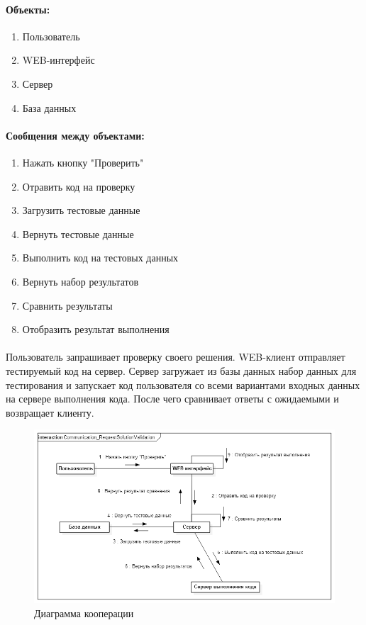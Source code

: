\documentclass{article}
\begin{document}
        \paragraph{Объекты:}
        \begin{enumerate}
            \item Пользователь
            \item WEB-интерфейс
            \item Сервер
            \item База данных
        \end{enumerate}
        \paragraph{Сообщения между объектами:}
        \begin{enumerate}
            \item Нажать кнопку "Проверить"
            \item Отравить код на проверку
            \item Загрузить тестовые данные
            \item Вернуть тестовые данные
            \item Выполнить код на тестовых данных
            \item Вернуть набор результатов
            \item Сравнить результаты
            \item Отобразить результат выполнения
        \end{enumerate}
        \paragraph{}
        Пользователь запрашивает проверку своего решения. WEB-клиент отправляет
        тестируемый код на сервер. Сервер загружает из базы данных набор
        данных для тестирования и запускает код пользователя со всеми вариантами
        входных данных на сервере выполнения кода. После чего сравнивает ответы
        с ожидаемыми и возвращает клиенту.
        \begin{figure}[H]
            \includegraphics[width=\textwidth, center]
                {Communication_RequestSolutionValidation}
            \caption{Диаграмма кооперации}
        \end{figure}
\end{document}
